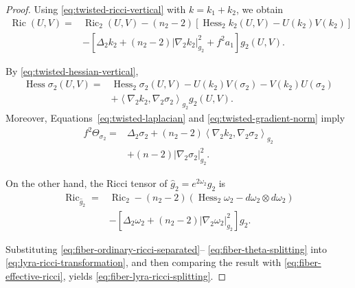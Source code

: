 \documentclass[a4paper,11pt]{article}
\theoremstyle{plain}
\numberwithin{equation}{section}
\begin{document}
\begin{proof}
	Using \eqref{eq:twisted-ricci-vertical} with
	\(k=k_{1}+k_{2}\), we obtain
	\begin{align}
		\operatorname{Ric}(U,V)
		={}&
		\operatorname{Ric}_{2}(U,V)
		-
		(n_{2}-2)
		\left[
		\operatorname{Hess}_{2}k_{2}(U,V)
		-
		U(k_{2})V(k_{2})
		\right]
		\nonumber\\
		&-
		\left[
		\Delta_{2}k_{2}
		+
		(n_{2}-2)
		\lvert\nabla_{2}k_{2}\rvert_{g_{2}}^{2}
		+
		f^{2}a_{1}
		\right]g_{2}(U,V).
		\label{eq:fiber-ordinary-ricci-separated}
	\end{align}
	
	By \eqref{eq:twisted-hessian-vertical},
	\begin{align}
		\operatorname{Hess}\sigma_{2}(U,V)
		={}&
		\operatorname{Hess}_{2}\sigma_{2}(U,V)
		-
		U(k_{2})V(\sigma_{2})
		-
		V(k_{2})U(\sigma_{2})
		\nonumber\\
		&+
		\left\langle
		\nabla_{2}k_{2},
		\nabla_{2}\sigma_{2}
		\right\rangle_{g_{2}}
		g_{2}(U,V).
		\label{eq:fiber-scale-hessian}
	\end{align}
	Moreover, Equations~\eqref{eq:twisted-laplacian} and
	\eqref{eq:twisted-gradient-norm} imply
	\begin{align}
		f^{2}\Theta_{\sigma_{2}}
		={}&
		\Delta_{2}\sigma_{2}
		+
		(n_{2}-2)
		\left\langle
		\nabla_{2}k_{2},
		\nabla_{2}\sigma_{2}
		\right\rangle_{g_{2}}
		\nonumber\\
		&+
		(n-2)
		\lvert\nabla_{2}\sigma_{2}\rvert_{g_{2}}^{2}.
		\label{eq:fiber-theta-splitting}
	\end{align}
	
	On the other hand, the Ricci tensor of
	\(\widehat g_{2}=e^{2\omega_{2}}g_{2}\) is
	\begin{align}
		\operatorname{Ric}_{\widehat g_{2}}
		={}&
		\operatorname{Ric}_{2}
		-
		(n_{2}-2)
		\left(
		\operatorname{Hess}_{2}\omega_{2}
		-
		d\omega_{2}\otimes d\omega_{2}
		\right)
		\nonumber\\
		&-
		\left[
		\Delta_{2}\omega_{2}
		+
		(n_{2}-2)
		\lvert\nabla_{2}\omega_{2}\rvert_{g_{2}}^{2}
		\right]g_{2}.
		\label{eq:fiber-effective-ricci}
	\end{align}
	
	Substituting
	\eqref{eq:fiber-ordinary-ricci-separated}--
	\eqref{eq:fiber-theta-splitting} into
	\eqref{eq:lyra-ricci-transformation}, and then comparing the
	result with \eqref{eq:fiber-effective-ricci}, yields
	\eqref{eq:fiber-lyra-ricci-splitting}.
\end{proof}
\end{document}
